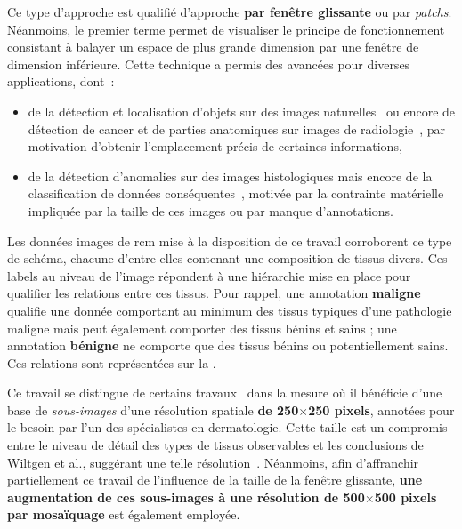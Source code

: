 Ce type d'approche est qualifié d'approche \textbf{par fenêtre glissante} ou par \textit{patchs}. Néanmoins, le premier terme permet de visualiser le principe de fonctionnement consistant à balayer un espace de plus grande dimension par une fenêtre de dimension inférieure. Cette technique a permis des avancées pour diverses applications, dont~: 
\begin{itemize}
    \item de la détection et localisation d'objets sur des images naturelles~\cite{Harzallah2009} ou encore de détection de cancer et de parties anatomiques sur images de radiologie~\cite{Helwan2017}, par motivation d'obtenir l'emplacement précis de certaines informations,
    \item de la détection d'anomalies sur des images histologiques mais encore de la classification de données conséquentes~\cite{Hou2016,Alqudah2019,Wei2019}, motivée par la contrainte matérielle impliquée par la taille de ces images ou par manque d'annotations.
\end{itemize}\par

Les données images de \gls{rcm} mise à la disposition de ce travail corroborent ce type de schéma, chacune d'entre elles contenant une composition de tissus divers. Ces labels au niveau de l'image répondent à une hiérarchie mise en place pour qualifier les relations entre ces tissus. Pour rappel, une annotation \textbf{maligne} qualifie une donnée comportant au minimum des tissus typiques d'une pathologie maligne mais peut également comporter des tissus bénins et sains ; une annotation \textbf{bénigne} ne comporte que des tissus bénins ou potentiellement sains. Ces relations sont représentées sur la .\par

Ce travail se distingue de certains travaux~\cite{Hou2016,Alqudah2019} dans la mesure où il bénéficie d'une base de \textit{sous-images} d'une résolution spatiale \textbf{de 250$\times$250 pixels}, annotées pour le besoin par l'un des spécialistes en dermatologie. Cette taille est un compromis entre le niveau de détail des types de tissus observables et les conclusions de Wiltgen et al., suggérant une telle résolution~\cite{Wiltgen2008}. Néanmoins, afin d'affranchir partiellement ce travail de l'influence de la taille de la fenêtre glissante, \textbf{une augmentation de ces sous-images à une résolution \textbf{de 500$\times$500 pixels} par mosaïquage} est également employée.\par

